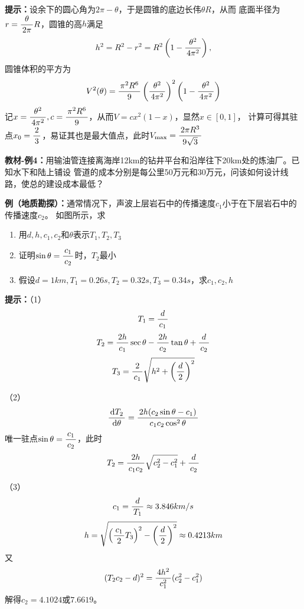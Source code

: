 {\bf 提示：}设余下的圆心角为$2\pi-\theta$，于是圆锥的底边长伟$\theta R$，从而
底面半径为$r=\df{\theta}{2\pi}R$，圆锥的高$h$满足
$$h^2=R^2-r^2=R^2\left(1-\df{\theta^2}{4\pi^2}\right),$$
圆锥体积的平方为
$$V^2(\theta)=\df{\pi^2R^6}9\left(\df{\theta^2}{4\pi^2}\right)^2
\left(1-\df{\theta^2}{4\pi^2}\right)$$
记$x=\df{\theta^2}{4\pi^2},c=\df{\pi^2R^6}9$，从而$V=cx^2(1-x)$，显然$x\in[0,1]$，
计算可得其驻点$x_0=\df23$，易证其也是最大值点，此时$V_{\max}=\df{2\pi R^3}{9\sqrt3}$

{\bf 教材-例4：}用输油管连接离海岸12km的钻井平台和沿岸往下20km处的炼油厂。已知水下和陆上铺设
管道的成本分别是每公里50万元和30万元，问该如何设计线路，使总的建设成本最低？

{\bf 例（地质勘探）：}通常情况下，声波上层岩石中的传播速度$c_1$小于在下层岩石中的传播速度$c_2$。
如图所示，求
\begin{enumerate}[(1)]
  \setlength{\itemindent}{1cm}
  \item 用$d,h,c_1,c_2$和$\theta$表示$T_1,T_2,T_3$
  \item 证明$\sin\theta=\df{c_1}{c_2}$时，$T_2$最小
  \item 假设$d=1km,T_1=0.26s,T_2=0.32s,T_3=0.34s$，求$c_1,c_2,h$
\end{enumerate}
\begin{center}
\end{center}

{\bf 提示：}（1）
$$T_1=\df d{c_1}$$
$$T_2=\df{2h}{c_1}\sec\theta-\df{2h}{c_2}\tan\theta+\df d{c_2}$$
$$T_3=\df2{c_1}\sqrt{h^2+\left(\df d2\right)^2}$$


（2）
$$\df{\d T_2}{\d\theta}=\df{2h(c_2\sin\theta-c_1)}{c_1c_2\cos^2\theta}$$
唯一驻点$\sin\theta=\df{c_1}{c_2}$，此时
$$T_2=\df{2h}{c_1c_2}\sqrt{c_2^2-c_1^2}+\df d{c_2}$$

（3）
$$c_1=\df{d}{T_1}\approx3.846km/s$$
$$h=\sqrt{\left(\df{c_1}2T_3\right)^2-\left(\df d2\right)^2}\approx0.4213km$$
又
$$(T_2c_2-d)^2=\df{4h^2}{c_1^2}(c_2^2-c_1^2)$$
解得$c_2=4.1024$或$7.6619$。


